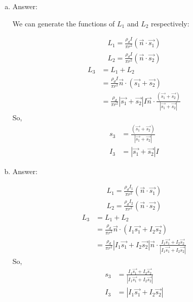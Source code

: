 \documentclass{homework}
\begin{document}
\begin{enumerate}[a)]

	\item Answer:
	
	We can generate the functions of $L_1$ and $L_2$ respectively:
	
	\begin{align*}
	L_1 = \frac{\rho_d I}{\pi r^2}(\overrightarrow{n} \cdot \overrightarrow{s_1})
	\end{align*}
	\begin{align*}
	L_2 = \frac{\rho_d I}{\pi r^2}(\overrightarrow{n} \cdot \overrightarrow{s_2})
	\end{align*}
	\begin{align*}
	L_3 &= L_1 + L_2 \\
	&= \frac{\rho_d I}{\pi r^2}\overrightarrow{n} \cdot (\overrightarrow{s_1}+\overrightarrow{s_2}) \\
	&= \frac{\rho_d }{\pi r^2}|\overrightarrow{s_1}+\overrightarrow{s_2}|I  \overrightarrow{n} \cdot \frac{(\overrightarrow{s_1}+\overrightarrow{s_2})}{|\overrightarrow{s_1}+\overrightarrow{s_2}|} 
	\end{align*}
	So,
	\begin{align*}
	s_3 &= \frac{(\overrightarrow{s_1}+\overrightarrow{s_2})}{|\overrightarrow{s_1}+\overrightarrow{s_2}|} \\
	I_3 &= |\overrightarrow{s_1}+\overrightarrow{s_2}| I
	\end{align*}
		
	\item Answer:
	
	\begin{align*}
	L_1 = \frac{\rho_d I_1}{\pi r^2}(\overrightarrow{n} \cdot \overrightarrow{s_1})
	\end{align*}
	\begin{align*}
	L_2 = \frac{\rho_d I_2}{\pi r^2}(\overrightarrow{n} \cdot \overrightarrow{s_2})
	\end{align*}
	\begin{align*}
	L_3 &= L_1 + L_2 \\
	&= \frac{\rho_d}{\pi r^2}\overrightarrow{n} \cdot (I_1 \overrightarrow{s_1}+I_2\overrightarrow{s_2}) \\
	&= \frac{\rho_d }{\pi r^2} |I_1 \overrightarrow{s_1}+I_2\overrightarrow{s_2}| \overrightarrow{n} \cdot 
	\frac{I_1 \overrightarrow{s_1}+I_2\overrightarrow{s_2}}{|I_1 \overrightarrow{s_1}+I_2\overrightarrow{s_2}|}
	\end{align*}
	So,
	\begin{align*}
	s_3 &= \frac{I_1 \overrightarrow{s_1}+I_2\overrightarrow{s_2}}{|I_1 \overrightarrow{s_1}+I_2\overrightarrow{s_2}|} \\
	I_3 &= |I_1 \overrightarrow{s_1}+I_2\overrightarrow{s_2}|
	\end{align*}
	
\end{enumerate}
\end{document}

